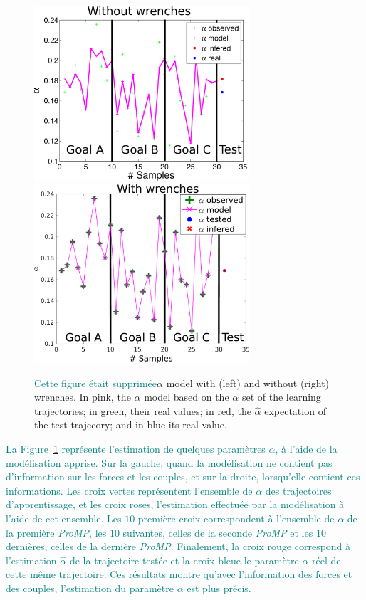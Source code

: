 \documentclass[utf8]{frontiersSCNS} %
\newcommand{\ori}[1]{\textcolor{teal}{#1}}
\begin{document}
\begin{figure}[h]
\centering
\includegraphics[width = 8cm]{img/realalphaModel.pdf} \includegraphics[width = 8cm]{img/alphaInfWithForces.pdf} 
\caption{\ori{Cette figure était supprimée}$\alpha$ model with (left) and without (right) wrenches. In pink, the $\alpha$ model based on the $\alpha$ set of the learning trajectories; in green, their real values; in red, the $\hat{\alpha}$ expectation of the test trajecory; and in blue its real value.
}
\label{fig:realalphaModel}
\end{figure}
\ori{La Figure~\ref{fig:realalphaModel} représente l'estimation de quelques paramètres $\alpha$, à l'aide de la modélisation apprise. Sur la gauche, quand la modélisation ne contient pas d'information sur les forces et les couples, et sur la droite, lorsqu'elle contient ces informations. Les croix vertes représentent l'ensemble de $\alpha$ des trajectoires d'apprentissage, et les croix roses, l'estimation effectuée par la modélisation à l'aide de cet ensemble. Les $10$ première croix correspondent à l'ensemble de $\alpha$ de la première \textit{ProMP}, les $10$ suivantes, celles de la seconde \textit{ProMP} et les $10$ dernières, celles de la dernière \textit{ProMP}. Finalement, la croix rouge correspond à l'estimation $\hat{\alpha}$ de la trajectoire testée et la croix bleue le paramètre $\alpha$ réel de cette même trajectoire. Ces résultats montre qu'avec l'information des forces et des couples, l'estimation du paramètre $\alpha$ est plus précis.}
\end{document}

